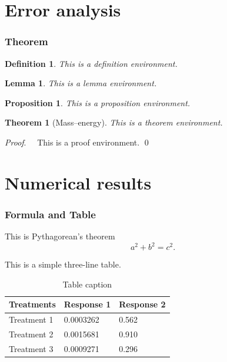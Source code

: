\documentclass[notheorems,11pt,compress]{beamer}
\newtheorem{theorem}{Theorem}
\numberwithin{theorem}{section}
\newtheorem{lemma}{Lemma}
\numberwithin{lemma}{section}
\numberwithin{corollary}{section}
\newtheorem{definition}{Definition}
\numberwithin{definition}{section}
\newtheorem{proposition}{Proposition}
\numberwithin{proposition}{section}
\theoremstyle{example}
\renewenvironment{proof}[1][Proof]{\textit{#1}.~~}{\qed\par}
\numberwithin{figure}{section}
\numberwithin{table}{section}
\numberwithin{equation}{section}
\begin{document}
\section{Error analysis}

\begin{frame}
\frametitle{Theorem}

\begin{definition}
This is a definition environment.
\end{definition}

\begin{lemma}
This is a lemma environment.
\end{lemma}

\begin{proposition}
This is a proposition environment.
\end{proposition}

\begin{theorem}[Mass--energy]
This is a theorem environment.
\end{theorem}

\begin{proof}
  This is a proof environment.
\end{proof}
\end{frame}


\section{Numerical results}  %


\begin{frame}
\frametitle{Formula and Table}

This is Pythagorean's theorem
\begin{equation}\label{Pythagorean}
  a^2+b^2=c^2.
\end{equation}

This is a simple three-line table.
\begin{table}
\caption{Table caption}
\begin{tabular}{l l l}
\toprule
Treatments & Response 1 & Response 2 \\
\midrule
Treatment 1 & 0.0003262 & 0.562 \\
Treatment 2 & 0.0015681 & 0.910 \\
Treatment 3 & 0.0009271 & 0.296 \\
\bottomrule
\end{tabular}
\end{table}

\end{frame}
\end{document}
